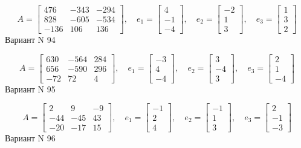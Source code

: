 \documentclass[11pt]{report}
\begin{document}
$$A = \left[\begin{matrix}476 & -343 & -294\\828 & -605 & -534\\-136 & 106 & 136\end{matrix}\right],\quad e_1 = \left[\begin{matrix}4\\-1\\-4\end{matrix}\right],\quad e_2 = \left[\begin{matrix}-2\\1\\3\end{matrix}\right],\quad e_3 = \left[\begin{matrix}1\\3\\2\end{matrix}\right]$$Вариант N 94

$$A = \left[\begin{matrix}630 & -564 & 284\\656 & -590 & 296\\-72 & 72 & 4\end{matrix}\right],\quad e_1 = \left[\begin{matrix}-3\\4\\-4\end{matrix}\right],\quad e_2 = \left[\begin{matrix}3\\-4\\3\end{matrix}\right],\quad e_3 = \left[\begin{matrix}2\\1\\-4\end{matrix}\right]$$Вариант N 95

$$A = \left[\begin{matrix}2 & 9 & -9\\-44 & -45 & 43\\-20 & -17 & 15\end{matrix}\right],\quad e_1 = \left[\begin{matrix}-1\\2\\4\end{matrix}\right],\quad e_2 = \left[\begin{matrix}-1\\1\\3\end{matrix}\right],\quad e_3 = \left[\begin{matrix}2\\-1\\-3\end{matrix}\right]$$Вариант N 96
\end{document}
